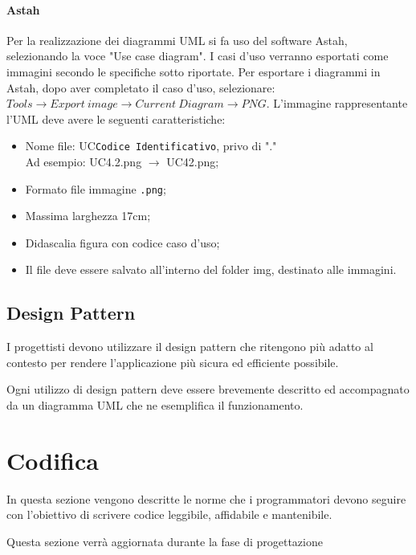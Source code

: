 \paragraph{Astah}
Per la realizzazione dei diagrammi UML si fa uso del software Astah, selezionando la voce "Use case diagram". 
I casi d'uso verranno esportati come immagini secondo le specifiche sotto riportate. Per esportare i diagrammi in Astah, dopo aver completato il caso d'uso, selezionare: $Tools \rightarrow Export\ image \rightarrow Current\ Diagram \rightarrow PNG$.
L'immagine rappresentante l'UML deve avere le seguenti caratteristiche:
\begin{itemize}
\item Nome file: UC\texttt{Codice Identificativo}, privo di "."\\
Ad esempio: UC4.2.png $\rightarrow$ UC42.png;
\item Formato file immagine \texttt{.png};
\item Massima larghezza 17cm;
\item Didascalia figura con codice caso d'uso;
\item Il file deve essere salvato all'interno del folder img, destinato alle immagini.
\end{itemize}

\subsection{Design Pattern}

I progettisti devono utilizzare il design pattern che ritengono più adatto al contesto per rendere l’applicazione più sicura ed efficiente possibile.

Ogni utilizzo di design pattern deve essere brevemente descritto ed accompagnato da un diagramma UML che ne esemplifica il funzionamento.

\section{Codifica}
In questa sezione vengono descritte le norme che i programmatori devono seguire con l’obiettivo di scrivere codice leggibile, affidabile e mantenibile.

Questa sezione verrà aggiornata durante la fase di progettazione


